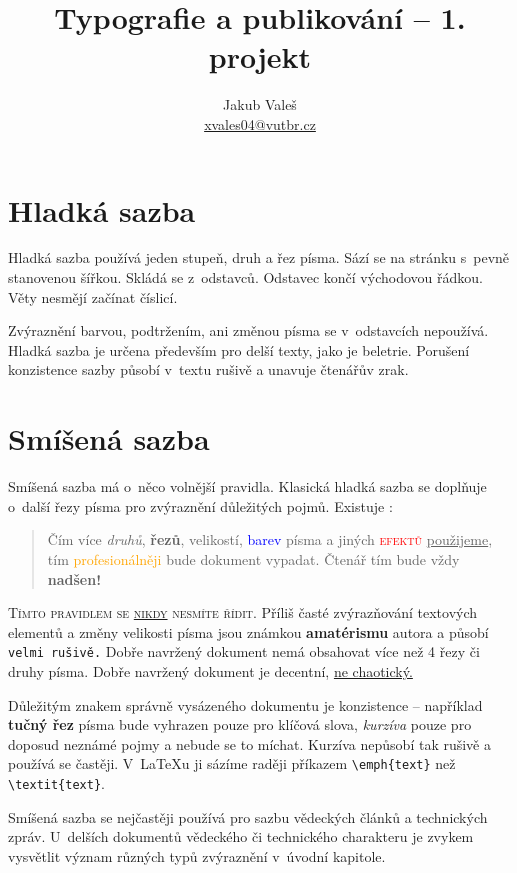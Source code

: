 \documentclass[a4paper, 10pt, twocolumn]{article}
\title{Typografie a publikování -- 1. projekt}
\author{Jakub Valeš \\ \href{mailto:xvales04@vutbr.cz}{xvales04@vutbr.cz}}
\date{}
\begin{document}
\maketitle

\section{Hladká sazba}
Hladká sazba používá jeden stupeň, druh a řez písma.
Sází se na stránku s~pevně stanovenou šířkou.
Skládá se z~odstavců. Odstavec končí východovou řádkou.
Věty nesmějí začínat číslicí.

Zvýraznění barvou, podtržením, ani změnou písma se v~odstavcích nepoužívá.
Hladká sazba je určena především pro delší texty, jako je beletrie.
Porušení konzistence sazby působí v~textu rušivě a unavuje čtenářův zrak.


\section{Smíšená sazba}
\label{Smíšená sazba}
Smíšená sazba má o~něco volnější pravidla.
Klasická hladká sazba se doplňuje o~další řezy písma pro zvýraznění důležitých pojmů.
Existuje :

\begin{quotation}
Čím více \emph{druhů}, \textbf{řezů}, {\huge velikostí}, \textcolor{blue}{barev} písma a jiných \textsc{\textcolor{red}{efektů}} \underline{použijeme}, tím \textcolor{orange}{profesionálněji} bude {\selectfont \Large dokument} vypadat.
{\tiny Čtenář} tím bude vždy {\huge\textbf{nadšen!}}
\end{quotation}

\textsc{Tímto pravidlem se \underline{nikdy} nesmíte řídit.}
Příliš časté zvýrazňování textových elementů a změny {\tiny velikosti} písma jsou známkou \textbf{amatérismu} autora a působí \texttt{velmi rušivě.}
Dobře navržený dokument nemá obsahovat více než 4 řezy či druhy písma.
Dobře navržený dokument je decentní, \underline{ne chaotický.}

Důležitým znakem správně vysázeného dokumentu je konzistence -- například \textbf{tučný řez} písma bude vyhrazen pouze pro klíčová slova, \emph{kurzíva} pouze pro doposud neznámé pojmy a nebude se to míchat.
Kurzíva nepůsobí tak rušivě a používá se častěji.
V~\LaTeX u ji sázíme raději příkazem \verb|\emph{text}| než \verb|\textit{text}|.

Smíšená sazba se nejčastěji používá pro sazbu vědeckých článků a technických zpráv.
U~delších dokumentů vědeckého či technického charakteru je zvykem vysvětlit význam různých typů zvýraznění v~úvodní kapitole.
\end{document}
